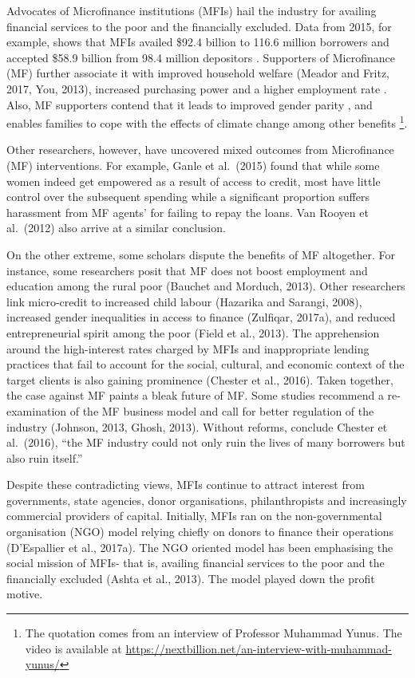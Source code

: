 \documentclass[a4paper, nobind]{templates/ociamthesis}
\begin{document}
\noindent Advocates of Microfinance institutions (MFIs) hail the industry for availing financial services to the poor and the financially excluded. Data from 2015, for example, shows that MFIs availed \$92.4 billion to 116.6 million borrowers and accepted \$58.9 billion from 98.4 million depositors \autocite{market2014global}. Supporters of Microfinance (MF) further associate it with improved household welfare \autocite{meador2017food,you2013role} (Meador and Fritz, 2017, You, 2013), increased purchasing power and a higher employment rate \autocite{lopatta2016microfinance,raihan2017macro}. Also, MF supporters contend that it leads to improved gender parity \autocite{mafukata2017reciprocal,zhang2017microfinance}, and enables families to cope with the effects of climate change \autocite{fenton2017role} among other benefits \footnote{The quotation comes from an interview of Professor Muhammad Yunus. The video is available at \url{https://nextbillion.net/an-interview-with-muhammad-yunus/}}.

Other researchers, however, have uncovered mixed outcomes from Microfinance (MF) interventions. For example, Ganle et al.~(2015) found that while some women indeed get empowered as a result of access to credit, most have little control over the subsequent spending while a significant proportion suffers harassment from MF agents' for failing to repay the loans. Van Rooyen et al.~(2012) also arrive at a similar conclusion.

On the other extreme, some scholars dispute the benefits of MF altogether. For instance, some researchers posit that MF does not boost employment and education among the rural poor (Bauchet and Morduch, 2013). Other researchers link micro-credit to increased child labour (Hazarika and Sarangi, 2008), increased gender inequalities in access to finance (Zulfiqar, 2017a), and reduced entrepreneurial spirit among the poor (Field et al., 2013). The apprehension around the high-interest rates charged by MFIs and inappropriate lending practices that fail to account for the social, cultural, and economic context of the target clients is also gaining prominence (Chester et al., 2016). Taken together, the case against MF paints a bleak future of MF. Some studies recommend a re-examination of the MF business model and call for better regulation of the industry (Johnson, 2013, Ghosh, 2013). Without reforms, conclude Chester et al.~(2016), ``the MF industry could not only ruin the lives of many borrowers but also ruin itself.''

Despite these contradicting views, MFIs continue to attract interest from governments, state agencies, donor organisations, philanthropists and increasingly commercial providers of capital. Initially, MFIs ran on the non-governmental organisation (NGO) model relying chiefly on donors to finance their operations (D'Espallier et al., 2017a). The NGO oriented model has been emphasising the social mission of MFIs- that is, availing financial services to the poor and the financially excluded (Ashta et al., 2013). The model played down the profit motive.
\end{document}
